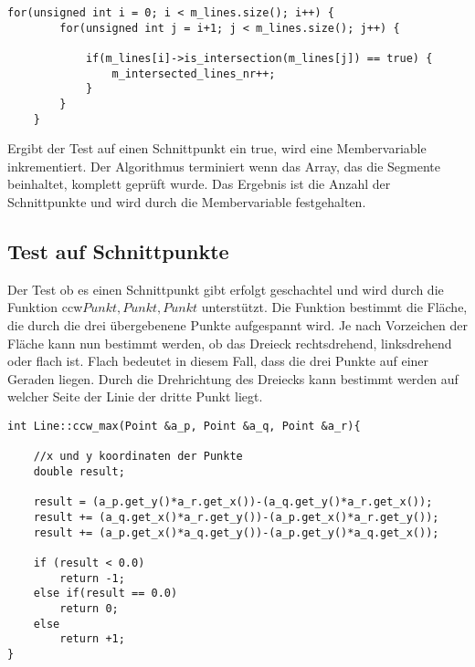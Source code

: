 \begin{lstlisting}[captionpos=b, caption={Schleifenkostrukt zur Schnittpunktsuche}, label=A1:Schleife]
	for(unsigned int i = 0; i < m_lines.size(); i++) {
		for(unsigned int j = i+1; j < m_lines.size(); j++) {

			if(m_lines[i]->is_intersection(m_lines[j]) == true) {
				m_intersected_lines_nr++;
			}
		}
	}
\end{lstlisting}

Ergibt der Test auf einen Schnittpunkt ein true, wird eine Membervariable inkrementiert. Der Algorithmus terminiert wenn das Array, das die Segmente beinhaltet, komplett geprüft wurde. Das Ergebnis ist die Anzahl der Schnittpunkte und wird durch die Membervariable festgehalten.

\subsection{Test auf Schnittpunkte}
\label{subsec:A1_Schnittpunkte}

Der Test ob es einen Schnittpunkt gibt erfolgt geschachtel und wird durch die Funktion ccw\(Punkt, Punkt, Punkt\) unterstützt. Die Funktion bestimmt die Fläche, die durch die drei übergebenene Punkte aufgespannt wird. Je nach Vorzeichen der Fläche kann nun bestimmt werden, ob das Dreieck rechtsdrehend, linksdrehend oder flach ist. Flach bedeutet in diesem Fall, dass die drei Punkte auf einer Geraden liegen. Durch die Drehrichtung des Dreiecks kann bestimmt werden auf welcher Seite der Linie der dritte Punkt liegt.

\begin{lstlisting}[captionpos=b, caption={ccw-Funktion - test der Drehrichtung}, label=A1:Counterclockwise]
int Line::ccw_max(Point &a_p, Point &a_q, Point &a_r){

	//x und y koordinaten der Punkte
	double result;

	result = (a_p.get_y()*a_r.get_x())-(a_q.get_y()*a_r.get_x());
	result += (a_q.get_x()*a_r.get_y())-(a_p.get_x()*a_r.get_y());
	result += (a_p.get_x()*a_q.get_y())-(a_p.get_y()*a_q.get_x());

	if (result < 0.0)
		return -1;
	else if(result == 0.0)
		return 0;
	else
		return +1;
}
\end{lstlisting}

